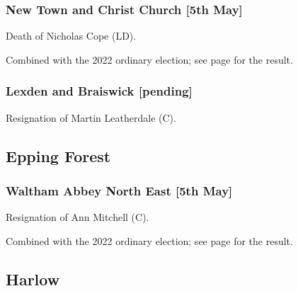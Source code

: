\documentclass[a4paper,openany]{book}
\begin{document}
\begin{resultsiii}
\subsubsection*{New Town and Christ Church \hspace*{\fill}\nolinebreak[1]%
	\enspace\hspace*{\fill}
	[5th May]}


Death of Nicholas Cope (LD).

Combined with the 2022 ordinary election; see page \pageref{ColchesterNewTownChristChurch} for the result.

\subsubsection*{Lexden and Braiswick \hspace*{\fill}\nolinebreak[1]%
	\enspace\hspace*{\fill}
	[pending]}


Resignation of Martin Leatherdale (C).

\subsection*{Epping Forest}

\subsubsection*{Waltham Abbey North East \hspace*{\fill}\nolinebreak[1]%
	\enspace\hspace*{\fill}
	[5th May]}


Resignation of Ann Mitchell (C).

Combined with the 2022 ordinary election; see page \pageref{EppingForestWalthamAbbeyNorthEast} for the result.

\subsection*{Harlow}


\end{resultsiii}
\end{document}
